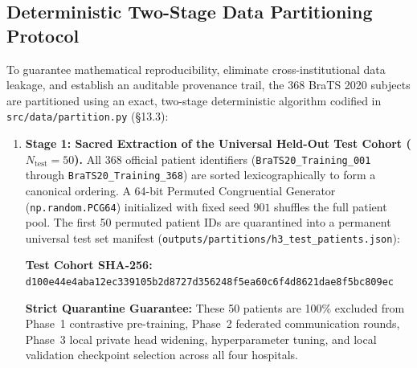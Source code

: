 \documentclass[10pt,a4paper]{article}
\begin{document}
\subsection{Deterministic Two-Stage Data Partitioning Protocol}
\label{sec:data_partitioning}
To guarantee mathematical reproducibility, eliminate cross-institutional data leakage, and establish an auditable provenance trail, the 368 BraTS 2020 subjects are partitioned using an exact, two-stage deterministic algorithm codified in \texttt{src/data/partition.py} (\S13.3):

\begin{enumerate}[itemsep=2pt, topsep=2pt]
    \item \textbf{Stage 1: Sacred Extraction of the Universal Held-Out Test Cohort ($N_{\text{test}} = 50$).}
    All 368 official patient identifiers (\texttt{BraTS20\_Training\_001} through \texttt{BraTS20\_Training\_368}) are sorted lexicographically to form a canonical ordering. A 64-bit Permuted Congruential Generator (\texttt{np.random.PCG64}) initialized with fixed seed $901$ shuffles the full patient pool. The first 50 permuted patient IDs are quarantined into a permanent universal test set manifest (\texttt{outputs/partitions/h3\_test\_patients.json}):
    \begin{center}
    \vspace{-4pt}
    \footnotesize \textbf{Test Cohort SHA-256:} \texttt{d100e44e4aba12ec339105b2d8727d356248f5ea60c6f4d8621dae8f5bc809ec}
    \vspace{-4pt}
    \end{center}

    \textbf{Strict Quarantine Guarantee:} These 50 patients are 100\% excluded from Phase~1 contrastive pre-training, Phase~2 federated communication rounds, Phase~3 local private head widening, hyperparameter tuning, and local validation checkpoint selection across all four hospitals.


\end{enumerate}
\end{document}
